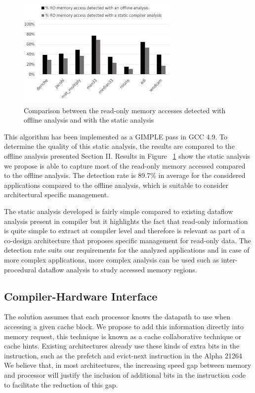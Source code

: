 \documentclass[sigconf]{acmart}
\begin{document}
\begin{figure}
    \centering
    \includegraphics[width=8cm]{./images/plugin_result.png}
    \caption{Comparison between the read-only memory accesses detected with offline analysis and with the static analysis}
    \label{comparAcces}
\end{figure}

This algorithm has been implemented as a GIMPLE pass in GCC 4.9. To determine the quality of this static analysis, the results are compared to the offline analysis presented Section II. Results in Figure ~\ref{comparAcces} show the static analysis we propose is able to capture most of the read-only memory accessed compared to the offline analysis. The detection rate is 89.7\% in average for the considered applications compared to the offline analysis, which is suitable to consider architectural specific management. 

The static analysis developed is fairly simple compared to existing dataflow analysis present in compiler but it highlights the fact that read-only information is quite simple to extract at compiler level and therefore is relevant as part of a co-design architecture that proposes specific management for read-only data. The detection rate suits our requirements for the analyzed applications and in case of more complex applications, more complex analysis can be used such as inter-procedural dataflow analysis to study accessed memory regions. 

\subsection{Compiler-Hardware Interface}

The solution assumes that each processor knows the datapath to use when accessing a given cache block. We propose to add this information directly into memory request, this technique is known as a cache collaborative technique or cache hints. Existing architectures already use these kinds of extra bits in the instruction, such as the prefetch and evict-next instruction in the Alpha 21264 We believe that, in most architectures, the increasing speed gap between memory and processor will justify the inclusion of additional bits in the instruction code to facilitate the reduction of this gap.
\end{document}
